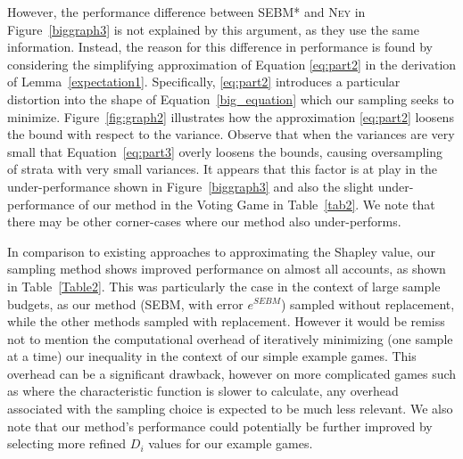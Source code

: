 \documentclass[]{interact}
\theoremstyle{plain}%
\theoremstyle{definition}
\theoremstyle{remark}
\begin{document}
However, the performance difference between SEBM* and \textsc{Ney} in Figure~\ref{biggraph3} is not explained by this argument, as they use the same information.
Instead, the reason for this difference in performance is found by considering the simplifying approximation of Equation \eqref{eq:part2} in the derivation of Lemma~\ref{expectation1}. 
Specifically, \eqref{eq:part2} introduces a particular distortion into the shape of Equation~\eqref{big_equation} which our sampling seeks to minimize.
Figure~\ref{fig:graph2} illustrates how the approximation \eqref{eq:part2} loosens the bound with respect to the variance. 
Observe that when the variances are very small that Equation~\eqref{eq:part3} overly loosens the bounds, causing oversampling of strata with very small variances. 
It appears that this factor is at play in the under-performance shown in Figure~\ref{biggraph3} and also the slight under-performance of our method in the Voting Game in Table~\ref{tab2}. 
We note that there may be other corner-cases where our method also under-performs.

In comparison to existing approaches to approximating the Shapley value, our sampling method shows improved performance on almost all accounts, as shown in Table~\ref{Table2}.
This was particularly the case in the context of large sample budgets, as our method (SEBM, with error $e^{SEBM}$) sampled without replacement, while the other methods sampled with replacement. 
However it would be remiss not to mention the computational overhead of iteratively minimizing (one sample at a time) our inequality in the context of our simple example games. 
This overhead can be a significant drawback, however on more complicated games such as where the characteristic function is slower to calculate, any overhead associated with the sampling choice is expected to be much less relevant. 
We also note that our method's performance could potentially be further improved by selecting more refined $D_i$ values for our example games.

% 
\end{document}
